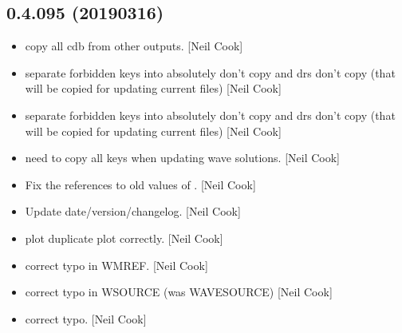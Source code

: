 \documentclass[a4paper,10pt,english]{report}
\begin{document}
\subsection{0.4.095 (2019\sphinxhyphen{}03\sphinxhyphen{}16)}
\label{\detokenize{misc/changelog:id183}}\begin{itemize}
\item {} 
 \sphinxhyphen{} copy all cdb from other outputs. {[}Neil Cook{]}

\item {} 
 \sphinxhyphen{} separate forbidden keys into absolutely don’t copy and
drs don’t copy (that will be copied for updating current files) {[}Neil
Cook{]}

\item {} 
 \sphinxhyphen{} separate forbidden keys into absolutely don’t copy and
drs don’t copy (that will be copied for updating current files) {[}Neil
Cook{]}

\item {} 
 \sphinxhyphen{} need to copy all keys when updating wave solutions.
{[}Neil Cook{]}

\item {} 
Fix the references to old values of . {[}Neil Cook{]}

\item {} 
Update date/version/changelog. {[}Neil Cook{]}

\item {} 
 \sphinxhyphen{} plot duplicate plot correctly. {[}Neil Cook{]}

\item {} 
 \sphinxhyphen{} correct typo in WMREF. {[}Neil Cook{]}

\item {} 
 \sphinxhyphen{} correct typo in WSOURCE (was WAVESOURCE)
{[}Neil Cook{]}

\item {} 
 \sphinxhyphen{} correct typo. {[}Neil Cook{]}

\end{itemize}
\end{document}
